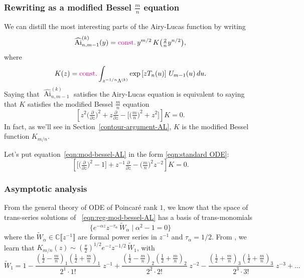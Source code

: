 \documentclass{article}
\theoremstyle{definition}
\newcommand{\C}{\mathbb{C}}
\newcommand{\series}[1]{\tilde{#1}}
\DeclareMathOperator{\Ai}{Ai}
\begin{document}
\subsubsection{Rewriting as a modified Bessel $\frac{m}{n}$ equation}
We can distill the most interesting parts of the Airy-Lucas function by writing
\[ \widehat{\Ai}^{(k)}_{n, m-1}(y) = \textcolor{magenta}{\text{const.}}\,y^{{m/2}}\,K\big(\tfrac{2}{n} y^{n/2}\big), \]
where
\begin{equation}\label{integral:mod-bessel-rational-AL}
K(z) = \textcolor{magenta}{\text{const.}} \int_{z^{-{1/n}}\Lambda^{(k)}} \exp\left[z T_n(u)\right]\,U_{m-1}(u)\,du.
\end{equation}
Saying that $\widehat{\Ai}^{(k)}_{n, m-1}$ satisfies the Airy-Lucas equation is equivalent to saying that $K$ satisfies the modified Bessel $\frac{m}{n}$ equation
\begin{equation}\label{eqn:mod-bessel-AL}
\left[z^2 \big(\tfrac{\partial}{\partial z}\big)^2 + z \tfrac{\partial}{\partial z} - \big[\big(\tfrac{m}{n} \big)^2 + z^2\big]\right] K = 0.
\end{equation}
In fact, as we’ll see in Section~\ref{contour-argument-AL}, $K$ is the modified Bessel function $K_{{m/n}}$.

Let's put equation~\eqref{eqn:mod-bessel-AL} in the form \eqref{eqn:standard ODE}:
\begin{equation}\label{eqn:reg-mod-bessel-AL}
\left[ \big[ \big(\tfrac{\partial}{\partial z}\big)^2 - 1 \big] + z^{-1} \tfrac{\partial}{\partial z} - \big({\tfrac{m}{n}}\big)^2 z^{-2} \right] K = 0.
\end{equation}

\subsubsection{Asymptotic analysis}\label{sec:asympt-AL}

From the general theory of ODE of Poincar\'e rank $1$, we know that the space of trans-series solutions of ~\eqref{eqn:reg-mod-bessel-AL} has a basis of trans-monomials
\[ \{ e^{-\alpha z} z^{-\tau_\alpha}\,\series{W}_\alpha \mid \alpha^2 - 1 = 0 \} \]
where the $\series{W}_\alpha\in\C\llbracket z^{-1} \rrbracket$ are formal power series in $z^{-1}$ and $\tau_\alpha=1/2$. From \cite[Equations 10.40.2 and 10.17.1]{dlmf}, we learn that $K_{m/n}(z) \sim \left(\tfrac{\pi}{2}\right)^{1/2} e^{-z} z^{-1/2}\,\series{W}_1$, with
\begin{equation}\label{bessel-asymp-AL}
\series{W}_1 = 1 - \frac{(\tfrac{1}{2}-\tfrac{m}{n})_1 (\tfrac{1}{2}+\frac{m}{n})_1}{2^1 \cdot 1!}\;z^{-1} + \frac{(\tfrac{1}{2}-\tfrac{m}{n})_2 (\tfrac{1}{2}+\tfrac{m}{n})_2}{2^2 \cdot 2!}\;z^{-2} - \frac{(\tfrac{1}{2}+\tfrac{m}{n})_3 (\tfrac{1}{2}+\tfrac{m}{n})_3}{2^3 \cdot 3!}\;z^{-3} + \ldots
\end{equation}
\end{document}
